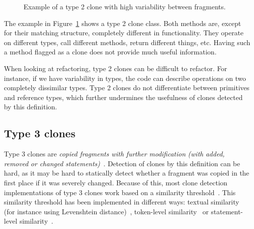 \begin{figure}[H]
\begin{parcolumns}{2}
\end{parcolumns}
\caption{Example of a type 2 clone with high variability between fragments.}
\label{fig:type2}
\end{figure}

The example in Figure~\ref{fig:type2} shows a type 2 clone class. Both methods are, except for their matching structure, completely different in functionality. They operate on different types, call different methods, return different things, etc. Having such a method flagged as a clone does not provide much useful information.

When looking at refactoring, type 2 clones can be difficult to refactor. For instance, if we have variability in types, the code can describe operations on two completely dissimilar types. Type 2 clones do not differentiate between primitives and reference types, which further undermines the usefulness of clones detected by this definition.

\subsection{Type 3 clones}\label{sec:type3}
Type 3 clones are \textit{copied fragments with further modification (with added, removed or changed statements)}~\cite{roy2007survey}. Detection of clones by this definition can be hard, as it may be hard to statically detect whether a fragment was copied in the first place if it was severely changed. Because of this, most clone detection implementations of type 3 clones work based on a similarity threshold~\cite{roy2008nicad,ragkhitwetsagul2019siamese,jiang2007deckard,semura2017ccfindersw}. This similarity threshold has been implemented in different ways: textual similarity (for instance using Levenshtein distance)~\cite{lavoie2011automated}, token-level similarity~\cite{sajnani2016sourcerercc} or statement-level similarity~\cite{kamalpriya2017enhancing}.

